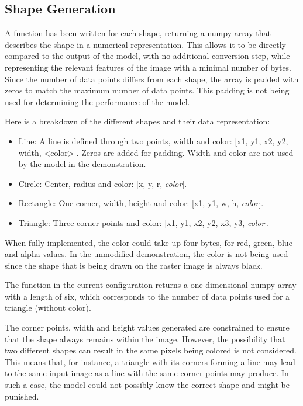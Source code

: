 \documentclass[12pt, a4paper, titlepage]{report}
\begin{document}
\subsection{Shape Generation}

A function has been written for each shape, returning a numpy array that describes the shape in a numerical representation. This allows it to be directly compared to the output of the model, with no additional conversion step, while representing the relevant features of the image with a minimal number of bytes. Since the number of data points differs from each shape, the array is padded with zeros to match the maximum number of data points. This padding is not being used for determining the performance of the model.

Here is a breakdown of the different shapes and their data representation:
\begin{itemize}
   \item Line: A line is defined through two points, width and color: [x1, y1, x2, y2, width, <color>]. Zeros are added for padding. Width and color are not used by the model in the demonstration.
   \item Circle: Center, radius and color: [x, y, r, \emph{color}].
   \item Rectangle: One corner, width, height and color: [x1, y1, w, h, \emph{color}].
   \item Triangle: Three corner points and color: [x1, y1, x2, y2, x3, y3, \emph{color}].
\end{itemize}

When fully implemented, the color could take up four bytes, for red, green, blue and alpha values. In the unmodified demonstration, the color is not being used since the shape that is being drawn on the raster image is always black.

The function in the current configuration returns a one-dimensional numpy array with a length of six, which corresponds to the number of data points used for a triangle (without color).


The corner points, width and height values generated are constrained to ensure that the shape always remains within the image. However, the possibility that two different shapes can result in the same pixels being colored is not considered. This means that, for instance, a triangle with its corners forming a line may lead to the same input image as a line with the same corner points may produce. In such a case, the model could not possibly know the correct shape and might be punished.
\end{document}
